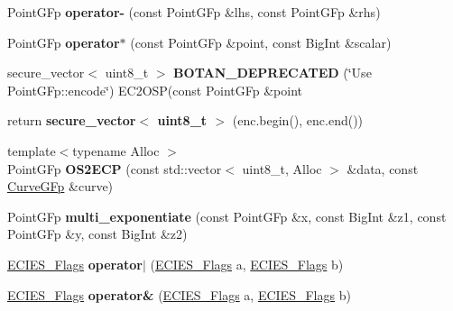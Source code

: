 \begin{DoxyCompactItemize}
Point\+G\+Fp {\bfseries operator-\/} (const Point\+G\+Fp \&lhs, const Point\+G\+Fp \&rhs)
\item 
\mbox{\label{namespace_botan_ad833dc0e005704e4e640e7090b1d2753}} 
Point\+G\+Fp {\bfseries operator$\ast$} (const Point\+G\+Fp \&point, const Big\+Int \&scalar)
\item 
\mbox{\label{namespace_botan_aed298213506b23172a7cc53b1a84327f}} 
secure\+\_\+vector$<$ uint8\+\_\+t $>$ {\bfseries B\+O\+T\+A\+N\+\_\+\+D\+E\+P\+R\+E\+C\+A\+T\+ED} (\char`\"{}Use Point\+G\+Fp\+::encode\char`\"{}) E\+C2\+O\+SP(const Point\+G\+Fp \&point
\item 
\mbox{\label{namespace_botan_a2f7dfc89a9ffff38439f28d6d2e26121}} 
return {\bfseries secure\+\_\+vector$<$ uint8\+\_\+t $>$} (enc.\+begin(), enc.\+end())
\item 
\mbox{\label{namespace_botan_a05d9540ebd0f083ea462cccfd0c095a4}} 
{\footnotesize template$<$typename Alloc $>$ }\\Point\+G\+Fp {\bfseries O\+S2\+E\+CP} (const std\+::vector$<$ uint8\+\_\+t, Alloc $>$ \&data, const \mbox{\hyperlink{class_botan_1_1_curve_g_fp}{Curve\+G\+Fp}} \&curve)
\item 
\mbox{\label{namespace_botan_a070abcff25ba10769893c5fd603084b2}} 
Point\+G\+Fp {\bfseries multi\+\_\+exponentiate} (const Point\+G\+Fp \&x, const Big\+Int \&z1, const Point\+G\+Fp \&y, const Big\+Int \&z2)
\item 
\mbox{\label{namespace_botan_a9ff752f8dbf6614ace0d74e981ab2d80}} 
\mbox{\hyperlink{namespace_botan_a9633493dccb5f879eeafafe99c71f6e8}{E\+C\+I\+E\+S\+\_\+\+Flags}} {\bfseries operator$\vert$} (\mbox{\hyperlink{namespace_botan_a9633493dccb5f879eeafafe99c71f6e8}{E\+C\+I\+E\+S\+\_\+\+Flags}} a, \mbox{\hyperlink{namespace_botan_a9633493dccb5f879eeafafe99c71f6e8}{E\+C\+I\+E\+S\+\_\+\+Flags}} b)
\item 
\mbox{\label{namespace_botan_a13be8f6b6160759047c0549b85055d43}} 
\mbox{\hyperlink{namespace_botan_a9633493dccb5f879eeafafe99c71f6e8}{E\+C\+I\+E\+S\+\_\+\+Flags}} {\bfseries operator\&} (\mbox{\hyperlink{namespace_botan_a9633493dccb5f879eeafafe99c71f6e8}{E\+C\+I\+E\+S\+\_\+\+Flags}} a, \mbox{\hyperlink{namespace_botan_a9633493dccb5f879eeafafe99c71f6e8}{E\+C\+I\+E\+S\+\_\+\+Flags}} b)

\end{DoxyCompactItemize}
